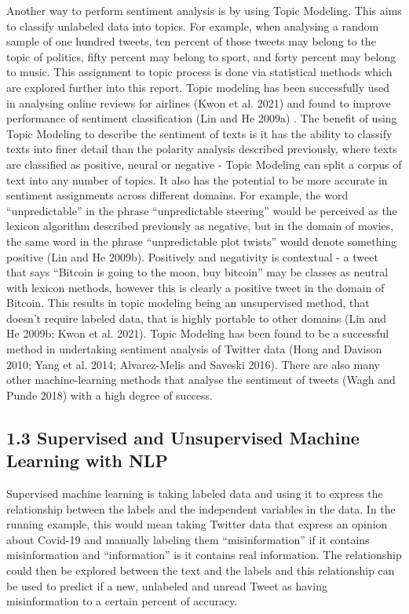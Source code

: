 \documentclass[
]{article}
\begin{document}
Another way to perform sentiment analysis is by using Topic Modeling.
This aims to classify unlabeled data into topics. For example, when
analysing a random sample of one hundred tweets, ten percent of those
tweets may belong to the topic of politics, fifty percent may belong to
sport, and forty percent may belong to music. This assignment to topic
process is done via statistical methods which are explored further into
this report. Topic modeling has been successfully used in analysing
online reviews for airlines (Kwon et al. 2021) and found to improve
performance of sentiment classification (Lin and He 2009a) . The benefit
of using Topic Modeling to describe the sentiment of texts is it has the
ability to classify texts into finer detail than the polarity analysis
described previously, where texts are classified as positive, neural or
negative - Topic Modeling can split a corpus of text into any number of
topics. It also has the potential to be more accurate in sentiment
assignments across different domains. For example, the word
``unpredictable'' in the phrase ``unpredictable steering'' would be
perceived as the lexicon algorithm described previously as negative, but
in the domain of movies, the same word in the phrase ``unpredictable
plot twists'' would denote something positive (Lin and He 2009b).
Positively and negativity is contextual - a tweet that says ``Bitcoin is
going to the moon, buy bitcoin'' may be classes as neutral with lexicon
methods, however this is clearly a positive tweet in the domain of
Bitcoin. This results in topic modeling being an unsupervised method,
that doesn't require labeled data, that is highly portable to other
domains (Lin and He 2009b; Kwon et al. 2021). Topic Modeling has been
found to be a successful method in undertaking sentiment analysis of
Twitter data (Hong and Davison 2010; Yang et al. 2014; Alvarez-Melis and
Saveski 2016). There are also many other machine-learning methods that
analyse the sentiment of tweets (Wagh and Punde 2018) with a high degree
of success.

\hypertarget{supervised-and-unsupervised-machine-learning-with-nlp}{%
\subsection{1.3 Supervised and Unsupervised Machine Learning with
NLP}\label{supervised-and-unsupervised-machine-learning-with-nlp}}

Supervised machine learning is taking labeled data and using it to
express the relationship between the labels and the independent
variables in the data. In the running example, this would mean taking
Twitter data that express an opinion about Covid-19 and manually
labeling them ``misinformation'' if it contains misinformation and
``information'' is it contains real information. The relationship could
then be explored between the text and the labels and this relationship
can be used to predict if a new, unlabeled and unread Tweet as having
misinformation to a certain percent of accuracy.
\end{document}
